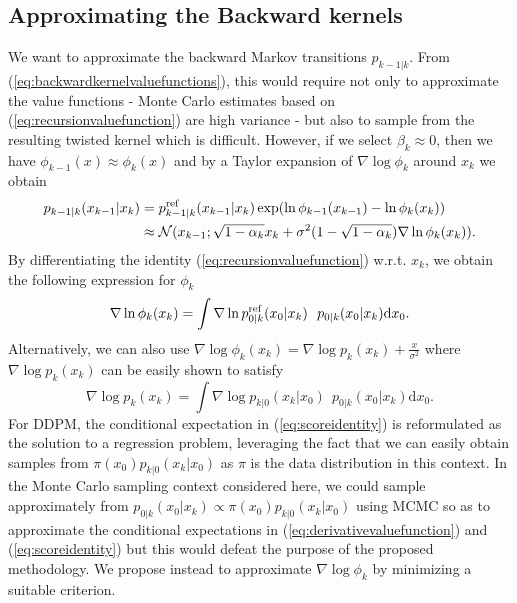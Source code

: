 \documentclass{article} %
\begin{document}
\subsection{Approximating the Backward kernels}
We want to approximate the backward Markov transitions $p_{k-1|k}$.  From (\ref{eq:backwardkernelvaluefunctions}), this would require not only to approximate the value functions - Monte Carlo estimates based on (\ref{eq:recursionvaluefunction}) are high variance - but also to sample from the resulting twisted kernel which is difficult.
However, if we select $\beta_k \approx 0$, then we have $\phi_{k-1}(x)\approx \phi_k(x)$ and by a Taylor expansion of $\nabla \log \phi_k$ around $x_k$ we obtain
\begin{align}
     p_{k-1|k}(x_{k-1}|x_{k})&=p^{\textup{ref}}_{k-1|k}(x_{k-1}|x_{k}) \exp(\log \phi_{k-1}(x_{k-1})- \log \phi_{k}(x_{k})) \nonumber\\
     &\approx \mathcal{N}(x_{k-1};\sqrt{1-\alpha_k}x_k+\sigma^2(1-\sqrt{1-\alpha_k}) \nabla \log \phi_k(x_k))
     \label{eq:approxDTreversalvalue}.
\end{align}
By differentiating the identity (\ref{eq:recursionvaluefunction}) w.r.t. $x_k$, we obtain the following expression for $\phi_k$
\begin{equation}\label{eq:derivativevaluefunction}
    \nabla \log \phi_k(x_k)=\int \nabla \log p^{\textup{ref}}_{0|k}(x_0|x_{k})~~  p_{0|k}(x_{0}|x_{k})\mathrm{d}x_{0}.
\end{equation}
Alternatively, we can also use $\nabla \log \phi_k(x_k)=\nabla \log p_k(x_k)+\tfrac{x}{\sigma^2}$ where $\nabla \log p_k(x_k)$ can be easily shown to satisfy 
\begin{equation}\label{eq:scoreidentity}
    \nabla \log p_k(x_k) = \int \nabla \log p_{k|0}(x_k|x_0)~~p_{0|k}(x_0|x_k)\mathrm{d}x_0.
\end{equation}
For DDPM, the conditional expectation in (\ref{eq:scoreidentity}) is reformulated as the solution to a regression problem, leveraging the fact that we can easily obtain samples from $ \pi(x_0)p_{k|0}(x_k|x_0)$ as $\pi$ is the data distribution in this context. In the Monte Carlo sampling context considered here, we could sample approximately from $p_{0|k}(x_0|x_k) \propto \pi(x_0)p_{k|0}(x_k|x_0)$ using MCMC so as to approximate the conditional expectations in (\ref{eq:derivativevaluefunction}) and (\ref{eq:scoreidentity}) but this would defeat the purpose of the proposed methodology. We propose instead to approximate $\nabla \log \phi_k$ by minimizing a suitable criterion.
\end{document}
